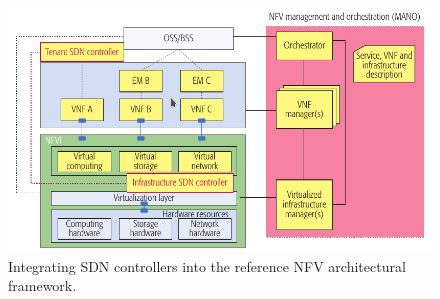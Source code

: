 \documentclass[a4paper,12pt]{report} %
\begin{document}
\begin{figure}[h]
\centering
\includegraphics[scale=0.56]{pics/integral.png} 
\caption{Integrating SDN controllers into the reference NFV architectural framework. \cite{ordonez2017network}}
\label{integral}
\end{figure}
\cite{ordonez2017network} \cite{etsi2017gs}


\newpage
\end{document}
